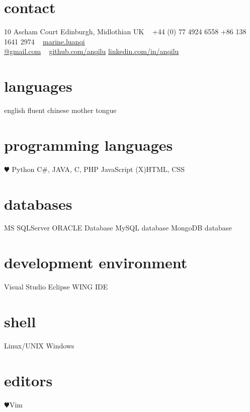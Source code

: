\documentclass[]{friggeri-cv} %
\begin{document}


\begin{aside} %
\section{contact}
10 Ascham Court
Edinburgh, Midlothian
UK
~
+44 (0) 77 4924 6558
+86 138 1641 2974
~
\href{mailto:marie.luanqi@gmail.com}{marine.luanqi\\@gmail.com}
~
\href{https://github.com/anqilu}{github.com/anqilu}
\href{https://www.linkedin.com/in/anqilu}{linkedin.com/in/anqilu}
\section{languages}
english fluent
chinese mother tongue
\section{programming languages}
{\color{red} $\varheartsuit$} Python
C\#, JAVA, C, PHP
JavaScript
(X)HTML, CSS
\section{databases}
MS SQLServer
ORACLE Database 
MySQL database
MongoDB database
\section{development environment}
Visual Studio
Eclipse
WING IDE
\section{shell}
Linux/UNIX
Windows
\section{editors}
{\color{red} $\varheartsuit$}Vim
\end{aside}
\end{document}
